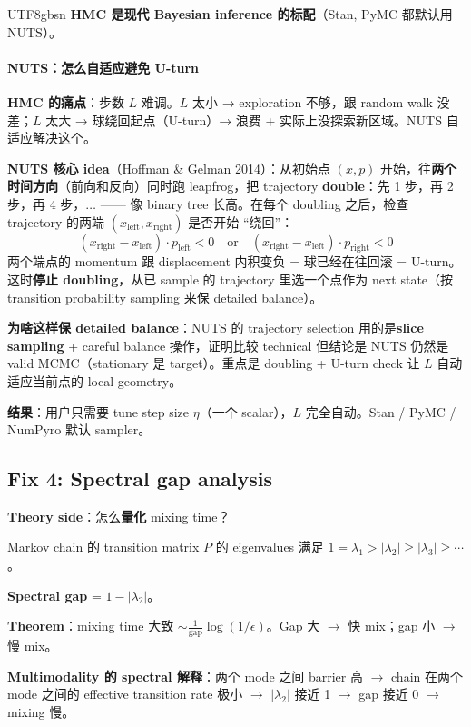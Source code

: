 \documentclass[11pt]{article}
\begin{document}
\begin{CJK}{UTF8}{gbsn}
\textbf{HMC 是现代 Bayesian inference 的标配}（Stan, PyMC 都默认用 NUTS）。

\paragraph{NUTS：怎么自适应避免 U-turn}

\textbf{HMC 的痛点}：步数 $L$ 难调。$L$ 太小 → exploration 不够，跟 random walk 没差；$L$ 太大 → 球绕回起点（U-turn）→ 浪费 + 实际上没探索新区域。NUTS 自适应解决这个。

\textbf{NUTS 核心 idea}（Hoffman \& Gelman 2014）：从初始点 $(x, p)$ 开始，往\textbf{两个时间方向}（前向和反向）同时跑 leapfrog，把 trajectory \textbf{double}：先 1 步，再 2 步，再 4 步，$\ldots$ —— 像 binary tree 长高。在每个 doubling 之后，检查 trajectory 的两端 $(x_{\text{left}}, x_{\text{right}})$ 是否开始 ``绕回''：
\[
(x_{\text{right}} - x_{\text{left}}) \cdot p_{\text{left}} < 0 \quad \text{or} \quad (x_{\text{right}} - x_{\text{left}}) \cdot p_{\text{right}} < 0
\]
两个端点的 momentum 跟 displacement 内积变负 = 球已经在往回滚 = U-turn。这时\textbf{停止 doubling}，从已 sample 的 trajectory 里选一个点作为 next state（按 transition probability sampling 来保 detailed balance）。

\textbf{为啥这样保 detailed balance}：NUTS 的 trajectory selection 用的是\textbf{slice sampling} + careful balance 操作，证明比较 technical 但结论是 NUTS 仍然是 valid MCMC（stationary 是 target）。重点是 doubling + U-turn check 让 $L$ 自动适应当前点的 local geometry。

\textbf{结果}：用户只需要 tune step size $\eta$（一个 scalar），$L$ 完全自动。Stan / PyMC / NumPyro 默认 sampler。

\subsection{Fix 4: Spectral gap analysis}

\textbf{Theory side}：怎么\textbf{量化} mixing time？

Markov chain 的 transition matrix $P$ 的 eigenvalues 满足 $1 = \lambda_1 > |\lambda_2| \geq |\lambda_3| \geq \cdots$。

\textbf{Spectral gap} = $1 - |\lambda_2|$。

\textbf{Theorem}：mixing time 大致 $\sim \frac{1}{\text{gap}} \log(1/\epsilon)$。Gap 大 $\to$ 快 mix；gap 小 $\to$ 慢 mix。

\textbf{Multimodality 的 spectral 解释}：两个 mode 之间 barrier 高 $\to$ chain 在两个 mode 之间的 effective transition rate 极小 $\to$ $|\lambda_2|$ 接近 1 $\to$ gap 接近 0 $\to$ mixing 慢。


\end{CJK}
\end{document}

